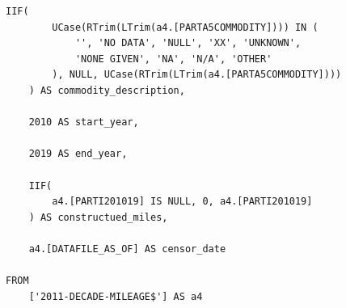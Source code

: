 \documentclass[letterpaper,10pt,oneside,final,onecolumn]{article}
\begin{document}
\begin{lstlisting}[label=mileage-query,caption={\textit{JetSQL} statement to pivot pipeline mileage}]
	IIF(
		UCase(RTrim(LTrim(a4.[PARTA5COMMODITY]))) IN (
			'', 'NO DATA', 'NULL', 'XX', 'UNKNOWN',
			'NONE GIVEN', 'NA', 'N/A', 'OTHER'
		), NULL, UCase(RTrim(LTrim(a4.[PARTA5COMMODITY])))
	) AS commodity_description,

	2010 AS start_year,

	2019 AS end_year,

	IIF(
		a4.[PARTI201019] IS NULL, 0, a4.[PARTI201019]
	) AS constructued_miles,

	a4.[DATAFILE_AS_OF] AS censor_date

FROM
	['2011-DECADE-MILEAGE$'] AS a4
	\end{lstlisting}
\end{document}
